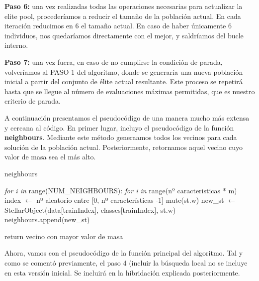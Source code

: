 \documentclass[10pt, a4paper]{article}
\theoremstyle{theorem-style}
\theoremstyle{theorem-style}
\theoremstyle{theorem2-style}
\theoremstyle{definition-style}
\theoremstyle{remark-style}
\theoremstyle{example-style}
\theoremstyle{definition-style}
\theoremstyle{remark-style}
\theoremstyle{remark-style}
\begin{document}
\textbf{Paso 6: } una vez realizadas todas las operaciones necesarias para actualizar la elite pool, procederíamos a reducir el tamaño de la población actual. En cada iteración reducimos en 6 el tamaño actual. En caso de haber únicamente 6 individuos, nos quedaríamos directamente con el mejor, y saldríamos del bucle interno. 

\textbf{Paso 7: } una vez fuera, en caso de no cumplirse la condición de parada, volveríamos al PASO 1 del algoritmo, donde se generaría una nueva población inicial a partir del conjunto de élite actual resultante. Este proceso se repetirá hasta que se llegue al número de evaluaciones máximas permitidas, que es nuestro criterio de parada. 

A continuación presentamos el pseudocódigo de una manera mucho más extensa y cercana al código. En primer lugar, incluyo el pseudocódigo de la función \textbf{neighbours}. Mediante este método generaamos todos los vecinos para cada solución de la población actual. Posteriormente, retornamos aquel vecino cuyo valor de masa sea el más alto. 

\vspace{1cm}

\begin{algorithm}
\caption{neighbours}\label{euclid}
\begin{algorithmic}[1]

\State \emph{for i in} range(NUM\_NEIGHBOURS): 
\State \hspace{1cm}\emph{for i in} range(nº caracteristicas * m)
\State \hspace{1.5cm} index $\gets$ nº aleatorio entre [0, nº características -1]
\State \hspace{1.5cm}mute(st.w)
\State \hspace{1cm}new\_st $\gets$ StellarObject(data[trainIndex], classes[trainIndex], st.w)
\State \hspace{1cm}neighbours.append(new\_st)

\State
\State return vecino con mayor valor de masa

\EndProcedure
\end{algorithmic}
\end{algorithm}

\vspace{1cm}

Ahora, vamos con el pseudocódigo de la función principal del algoritmo. Tal y como se comentó previamente, el paso 4 (incluir la búsqueda local no se incluye en esta versión inicial. Se incluirá en la hibridación explicada posteriormente. 
\end{document}
